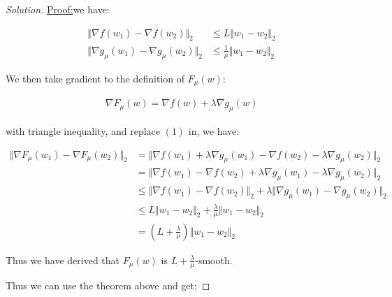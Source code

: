 \documentclass{article}
\newenvironment{solution}
  {\renewcommand\qedsymbol{$\blacksquare$}\begin{proof}[Solution]}
  {\end{proof}}
\newenvironment{claimproof}[1]{\par\noindent\underline{Proof:}\space#1}{}
\begin{document}
\begin{solution}
\begin{claimproof}
        


        we have:

        \begin{align*}
            \Vert \nabla f(w_1) - \nabla f(w_2) \Vert_2 &\leq L \Vert w_1 - w_2 \Vert_2 \\ 
            \Vert \nabla g_\mu(w_1) - \nabla g_\mu(w_2) \Vert_2 &\leq \frac{1}{\mu} \Vert w_1 - w_2 \Vert_2 \tag{1}
        \end{align*}

        We then take gradient to the definition of $F_\mu(w)$:

        \begin{align*}
            \nabla F_\mu(w) = \nabla f(w) + \lambda \nabla g_\mu(w)
        \end{align*}

        with triangle inequality, and replace $(1)$ in, we have:

        \begin{align*}
            \Vert \nabla F_\mu(w_1) - \nabla F_\mu(w_2) \Vert_2 
            &= \Vert \nabla f(w_1) + \lambda \nabla g_\mu(w_1) - \nabla f(w_2) - \lambda \nabla g_\mu(w_2) \Vert_2 \\
            &= \Vert \nabla f(w_1) - \nabla f(w_2) + \lambda \nabla g_\mu(w_1) - \lambda \nabla g_\mu(w_2) \Vert_2 \\
            &\leq \Vert \nabla f(w_1) - \nabla f(w_2) \Vert_2 + \lambda \Vert \nabla g_\mu(w_1) - \nabla g_\mu(w_2) \Vert_2 \\
            &\leq L \Vert w_1 - w_2 \Vert_2 + \frac{\lambda}{\mu} \Vert w_1 - w_2 \Vert_2 \\
            &= \left(L + \frac{\lambda}{\mu}\right) \Vert w_1 - w_2 \Vert_2
        \end{align*}

        Thus we have derived that $F_\mu(w)$ is $L + \frac{\lambda}{\mu}$-smooth.
        \bigskip

        Thus we can use the theorem above and get:


\end{claimproof}
\end{solution}
\end{document}
